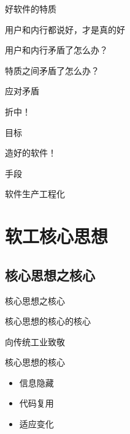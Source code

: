 \documentclass[CJK]{beamer}
\begin{document}
\begin{frame}{好软件的特质}
  \begin{block}{}
    \begin{center}
      \LARGE 用户和内行都说好，才是真的好
    \end{center}
  \end{block}
  \pause
  \begin{block}{}
    \begin{center}
      用户和内行矛盾了怎么办？

      特质之间矛盾了怎么办？
    \end{center}
  \end{block}
\end{frame}

\begin{frame}{}
  \begin{alertblock}{应对矛盾}
    \begin{center}
      \Huge 折中！
    \end{center}
  \end{alertblock}
  \pause
  \begin{block}{目标}
    \begin{center}
      \Huge 造好的软件！
    \end{center}
  \end{block}
  \pause
  \begin{block}{手段}
    \begin{center}
      \Huge 软件生产工程化
    \end{center}
  \end{block}
\end{frame}

\section{软工核心思想}

\subsection{核心思想之核心}

\begin{frame}{核心思想之核心}
  \begin{block}{核心思想的核心的核心}
    \begin{center}
      \Huge 向传统工业致敬
    \end{center}
  \end{block}
  \pause
  \begin{block}{核心思想的核心}
    \begin{itemize}
      \item 信息隐藏
      \pause
      \item 代码复用
      \pause
      \item 适应变化
    \end{itemize}
  \end{block}
\end{frame}
\end{document}
